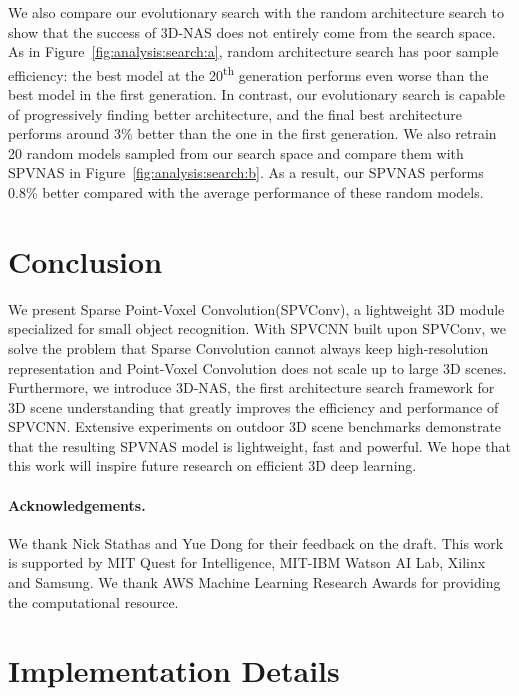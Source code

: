 \documentclass[runningheads]{llncs}
\newcommand{\fig}[1]{Figure~\ref{#1}}
\def\module{Sparse Point-Voxel Convolution\xspace}
\def\moduleshort{SPVConv\xspace}
\def\cnnshort{SPVCNN\xspace}
\def\modelshort{SPVNAS\xspace}
\def\nasshort{3D-NAS\xspace}
\begin{document}
We also compare our evolutionary search with the random architecture search to show that the success of \nasshort does not entirely come from the search space. As in \fig{fig:analysis:search:a}, random architecture search has poor sample efficiency: the best model at the 20\textsuperscript{th} generation performs even worse than the best model in the first generation. In contrast, our evolutionary search is capable of progressively finding better architecture, and the final best architecture performs around 3\% better than the one in the first generation. We also retrain 20 random models sampled from our search space and compare them with \modelshort in \fig{fig:analysis:search:b}. As a result, our \modelshort performs 0.8\% better compared with the average performance of these random models.
 \section{Conclusion}

We present \module (\moduleshort), a lightweight 3D module specialized for small object recognition. With \cnnshort built upon \moduleshort, we solve the problem that Sparse Convolution cannot always keep high-resolution representation and Point-Voxel Convolution does not scale up to large 3D scenes. Furthermore, we introduce \nasshort, the first architecture search framework for 3D scene understanding that greatly improves the efficiency and performance of \cnnshort. Extensive experiments on outdoor 3D scene benchmarks demonstrate that the resulting \modelshort model is lightweight, fast and powerful. We hope that this work will inspire future research on efficient 3D deep learning. \paragraph{Acknowledgements.}

We thank Nick Stathas and Yue Dong for their feedback on the draft. This work is supported by MIT Quest for Intelligence, MIT-IBM Watson AI Lab, Xilinx and Samsung. We thank AWS Machine Learning Research Awards for providing the computational resource. 



\clearpage
\appendix
\renewcommand{\thesection}{A.\arabic{section}}
\renewcommand{\thefigure}{A\arabic{figure}}
\setcounter{section}{0}
\setcounter{figure}{0}

\section{Implementation Details}
\end{document}
